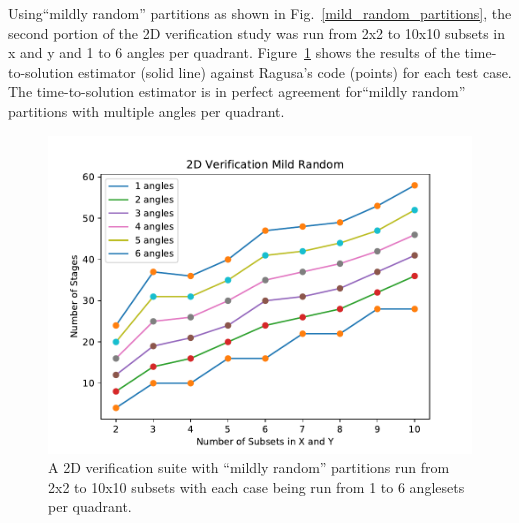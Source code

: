 Using``mildly random'' partitions as shown in Fig.~\ref{mild_random_partitions}, the second portion of the 2D verification study was run from 2x2 to 10x10 subsets in x and y and 1 to 6 angles per quadrant.  Figure~\ref{mild_random_verification} shows the results of the time-to-solution estimator (solid line) against Ragusa's code (points) for each test case. The time-to-solution estimator is in perfect agreement for``mildly random'' partitions with multiple angles per quadrant.

\begin{figure}[H]
\centering
\includegraphics[scale=0.8]{../figures/mild_random_verification.pdf}
\caption{A 2D verification suite with ``mildly random'' partitions run from 2x2 to 10x10 subsets with each case being run from 1 to 6 anglesets per quadrant.}
\label{mild_random_verification}
\end{figure}

